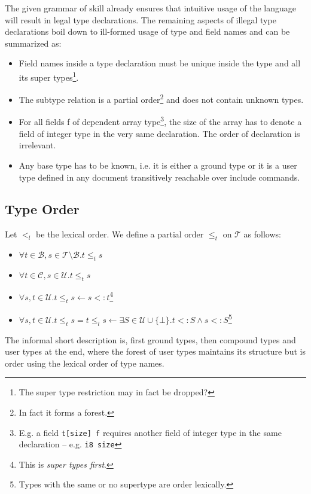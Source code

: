 \documentclass[a4paper,10pt]{article}
\begin{document}
The given grammar of \gls{skill} already ensures that intuitive usage of the language will result in legal type declarations. The remaining aspects of illegal type declarations boil down to ill-formed usage of type and field names and can be summarized as:
\begin{itemize}
 \item Field names inside a type declaration must be unique inside the type and all its super types\footnote{The super type restriction may in fact be dropped?}.
 
 \item The subtype relation is a partial order\footnote{In fact it forms a forest.} and does not contain unknown types.

 \item For all fields f of dependent array type\footnote{E.g. a field \texttt{t[size] f} requires another field of integer type in the same declaration -- e.g. \texttt{i8 size}}, the size of the array has to denote a field of integer type in the very same declaration. The order of declaration is irrelevant.
 
 \item Any base type has to be known, i.e. it is either a ground type or it is a user type defined in any document transitively reachable over include commands.
\end{itemize}


\subsection{Type Order}

Let $<_l$ be the lexical order. We define a partial order $\leq_t$ on $\mathcal{T}$ as follows:
\begin{itemize}
 \item $\forall t \in \mathcal{B}, s \in \mathcal{T}\setminus\mathcal{B}. t \leq_t s$
 \item $\forall t \in \mathcal{C}, s \in \mathcal{U}. t \leq_t s$
 \item $\forall s,t \in \mathcal{U}. t \leq_t s \leftarrow s <: t $\footnote{This is \textit{super types first}.}
 \item $\forall s,t \in \mathcal{U}. t \leq_t s = t \leq_l s\leftarrow \exists S \in \mathcal{U} \cup \{\bot\}. t <: S \wedge s <: S $\footnote{Types with the same or no supertype are order lexically.}
\end{itemize}

The informal short description is, first ground types, then compound types and user types at the end, where the forest of user types maintains its structure but is order using the lexical order of type names.
\end{document}
